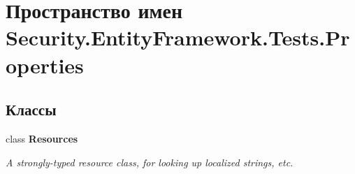 \hypertarget{namespace_security_1_1_entity_framework_1_1_tests_1_1_properties}{}\section{Пространство имен Security.\+Entity\+Framework.\+Tests.\+Properties}
\label{namespace_security_1_1_entity_framework_1_1_tests_1_1_properties}
\subsection*{Классы}
\begin{DoxyCompactItemize}
\item 
class {\bfseries Resources}
\begin{DoxyCompactList}\small\item\em A strongly-\/typed resource class, for looking up localized strings, etc. \end{DoxyCompactList}\end{DoxyCompactItemize}
